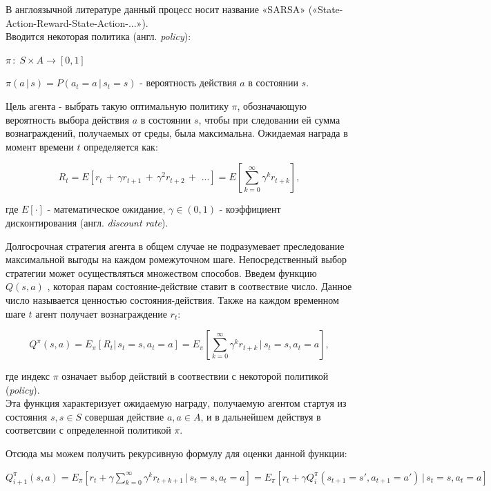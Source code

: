 \documentclass[a4paper]{report}
\theoremstyle{definition}
\theoremstyle{plain}
\theoremstyle{remark}
\theoremstyle{remark}
\theoremstyle{definition}
\begin{document}
В англоязычной литературе данный процесс носит название «SARSA» («State-Action-Reward-State-Action-...»).\\

Вводится некоторая политика (англ. \textit{policy}):
\begin{center}
	$\pi \, : \; S \times A \rightarrow [0, 1]$

$\pi(a\,|\,s) = P(a_t=a\,|\,s_t=s)$ - вероятность действия $a$ в состоянии $s$.
\end{center}

Цель агента - выбрать такую оптимальную политику $\pi$, обозначающую вероятность выбора действия $a$ в состоянии $s$, чтобы при следовании ей сумма вознаграждений, получаемых от среды, была максимальна.
Ожидаемая награда в момент времени $t$ определяется как:

$$R_t = E[r_t \,+\, \gamma r_{t+1} \,+\, \gamma^2 r_{t+2}\, +\,\, ...] = E\left[\sum_{k=0}^{\infty}\gamma^kr_{t+k}\right],$$

где $E[\cdot]$ - математическое ожидание, $\gamma\in(0, 1)$ - коэффициент дисконтирования (англ. \textit{discount rate}).

Долгосрочная стратегия агента в общем случае не подразумевает преследование максимальной выгоды на каждом ромежуточном шаге. Непосредственный выбор стратегии может осуществляться множеством способов.
Введем функцию $Q(s,a)$ , которая парам состояние-действие ставит в соотвествие число. Данное число называется ценностью состояния-действия. Также на каждом временном шаге $ t $ агент получает вознаграждение $ r_{t} $:

$$Q^{\pi}(s, a) = E_{\pi}[R_t|\,s_t=s, a_t=a] = E_{\pi}\left[\sum_{k=0}^{\infty}\gamma^kr_{t+k}\,|\,s_t=s, a_t=a\right],$$

где индекс $\pi$ означает выбор действий в соотвествии с некоторой политикой (\textit{policy}).\\

Эта функция характеризует ожидаемую награду, получаемую агентом стартуя из состояния $s, s \in S$ совершая действие $a, a \in A$, и в дальнейшем действуя в соответсвии с определенной политикой $\pi$.

Отсюда мы можем получить рекурсивную формулу для оценки данной функции:\\

\begin{center}
	$Q_{i+1}^{\pi}(s, a) = E_{\pi}\left[r_t + \gamma\sum_{k=0}^{\infty}\gamma^kr_{t+k+1}\,|\,s_t=s, a_t=a\right] = E_{\pi}\left[r_t + \gamma Q_{i}^{\pi}(s_{t+1}=s', a_{t+1}=a')\,|\,s_t=s, a_t=a\right]$
\end{center}
\end{document}
